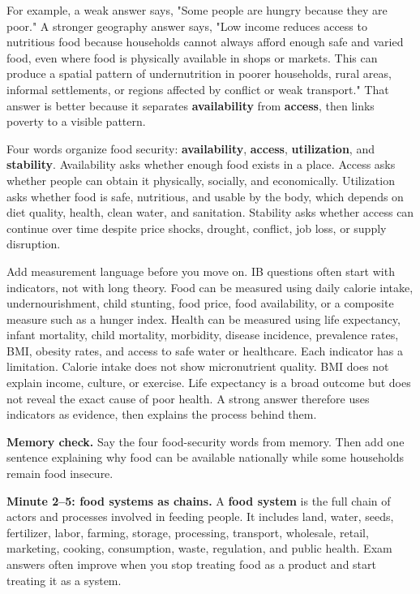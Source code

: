 \documentclass[11pt,a4paper]{article}
\newcommand{\term}[1]{\textcolor{HeadingBlue}{\textbf{#1}}}
\begin{document}
For example, a weak answer says, "Some people are hungry because they are poor."
A stronger geography answer says, "Low income reduces access to nutritious food
because households cannot always afford enough safe and varied food, even where
food is physically available in shops or markets. This can produce a spatial
pattern of undernutrition in poorer households, rural areas, informal
settlements, or regions affected by conflict or weak transport." That answer is
better because it separates \term{availability} from \term{access}, then links
poverty to a visible pattern.

Four words organize food security: \term{availability}, \term{access},
\term{utilization}, and \term{stability}. Availability asks whether enough food
exists in a place. Access asks whether people can obtain it physically,
socially, and economically. Utilization asks whether food is safe, nutritious,
and usable by the body, which depends on diet quality, health, clean water, and
sanitation. Stability asks whether access can continue over time despite price
shocks, drought, conflict, job loss, or supply disruption.

Add measurement language before you move on. IB questions often start with
indicators, not with long theory. Food can be measured using daily calorie
intake, undernourishment, child stunting, food price, food availability, or a
composite measure such as a hunger index. Health can be measured using life
expectancy, infant mortality, child mortality, morbidity, disease incidence,
prevalence rates, BMI, obesity rates, and access to safe water or healthcare.
Each indicator has a limitation. Calorie intake does not show micronutrient
quality. BMI does not explain income, culture, or exercise. Life expectancy is a
broad outcome but does not reveal the exact cause of poor health. A strong
answer therefore uses indicators as evidence, then explains the process behind
them.

\textbf{Memory check.} Say the four food-security words from memory. Then add
one sentence explaining why food can be available nationally while some
households remain food insecure.

\textbf{Minute 2--5: food systems as chains.}
A \term{food system} is the full chain of actors and processes involved in
feeding people. It includes land, water, seeds, fertilizer, labor, farming,
storage, processing, transport, wholesale, retail, marketing, cooking,
consumption, waste, regulation, and public health. Exam answers often improve
when you stop treating food as a product and start treating it as a system.
\end{document}
